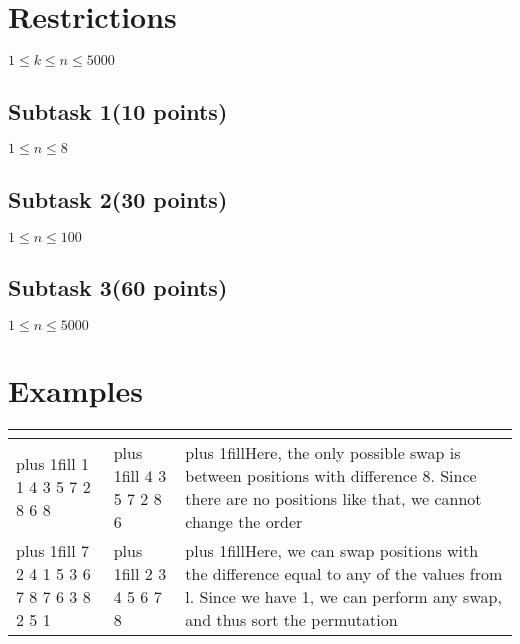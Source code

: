 \documentclass{article}
\begin{document}
\section*{Restrictions}
$1 \leq k \leq n \leq 5000$
\subsection*{Subtask 1(10 points)}
$1 \leq n \leq 8$
\subsection*{Subtask 2(30 points)}
$1 \leq n \leq 100$
\subsection*{Subtask 3(60 points)}
$1 \leq n \leq 5000$

\section*{Examples}
\newenvironment{examplesexplained}{%
    \ttfamily\obeylines\obeyspaces\frenchspacing%
    \begin{tabular}{|l|l|l|}%
    \hline%
    \multicolumn{1}{|c|}{\bf\texttt{\xmakefirstuc{\@input}}}&%
    \multicolumn{1}{|c|}{\bf\texttt{\xmakefirstuc{\@output}}}&%
    \multicolumn{1}{|c|}{\bf\texttt{\xmakefirstuc{\@explanations}}}%
    \\%
    \hline%
}
{
\end{tabular}%
}

\newcommand\exmpexplained[3]{%
    \begin{minipage}[t]{0.25\textwidth}\rightskip=0pt plus 1fill\relax #1 \medskip\end{minipage}&%
    \begin{minipage}[t]{0.25\textwidth}\rightskip=0pt plus 1fill\relax #2 \medskip\end{minipage}&%
    \begin{minipage}[t]{0.42\textwidth}\rightskip=0pt plus 1fill\relax #3 \medskip\end{minipage}\\%
    \hline%
}

\begin{examplesexplained}%

\exmpexplained{8 1
1 4 3 5 7 2 8 6 
8 
}{1 4 3 5 7 2 8 6 
}{Here, the only possible swap is between positions with difference 8. Since there are no positions like that, we cannot change the order}
\exmpexplained{8 7
2 4 1 5 3 6 7 8 
7 6 3 8 2 5 1 
}{1 2 3 4 5 6 7 8 
}{Here, we can swap positions with the difference equal to any of the values from l. Since we have 1, we can perform any swap, and thus sort the permutation}
\end{examplesexplained}%
\end{document}
